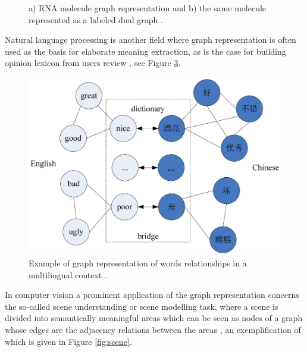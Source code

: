 \begin{figure}[ht]
\begin{subfigure}{.4\textwidth}
        \label{fig:ldg}
        \caption{}
    \end{subfigure}
    \caption{a) RNA molecule graph representation and b) the same molecule represented
        as a labeled dual graph \cite{conf/psb/KarklinMH05}.}
    \label{fig:bio}
\end{figure}

Natural language processing is another field where graph representation is often used
as the basis for elaborate meaning extraction, as is the case for building opinion
lexicon from users review \cite{10.1371/journal.pone.0079294}, see Figure \ref{fig:wordrel}.

\begin{figure}[ht]
    \centering
    \includegraphics[width=.6\linewidth]{Figures/wordrel}
    \caption{Example of graph representation of words relationships in a multilingual
    context \cite{10.1371/journal.pone.0079294}.}
    \label{fig:wordrel}
\end{figure}

In computer vision a prominent application of the graph representation concerns
the so-called scene understanding or scene modelling task, where a scene is divided
into semantically meaningful areas which can be seen as nodes of a graph whose
edges are the adjacency relations between the areas \cite{journals/corr/abs-1108-4079},
an exemplification of which is given in Figure \ref{fig:scene}.

